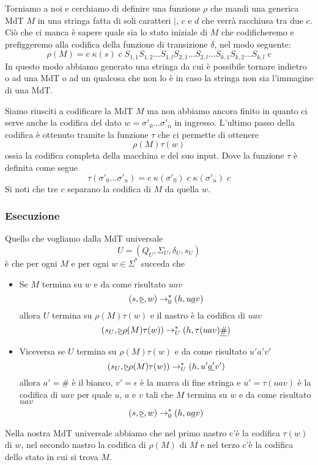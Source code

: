 Torniamo a noi e cerchiamo di definire una funzione $\rho$ che
mandi una generica MdT $M$ in una stringa fatta di soli caratteri
$\mid$, $c$ e $d$ che verrà racchiusa tra due $c$. Ciò che ci
manca è sapere quale sia lo stato iniziale di $M$ che
codificheremo e prefiggeremo alla codifica della funzione di
transizione $\delta$, nel modo seguente:
\[
	\rho (M) = c \; \kappa (s) \; c \;
	S_{1,1} S_{1,2} \dots
	S_{1,l} S_{2,1} \dots S_{2,l} \dots
	S_{k,1} S_{k,2} \dots S_{k,l} \; c
\]
In questo modo abbiamo generato una stringa da cui è possibile
tornare indietro o ad una MdT o ad un qualcosa che non lo è in
caso la stringa non sia l'immagine di una MdT.

Siamo riusciti a codificare la MdT $M$ ma non abbiamo ancora
finito in quanto ci serve anche la codifica del dato
$w = \sigma'_0 \dots \sigma'_n$ in ingresso. L'ultimo passo
della codifica è ottenuto tramite la funzione $\tau$ che ci
permette di ottenere
\[ \rho(M) \tau(w) \]
ossia la codifica completa della macchina e del suo input. Dove
la funzione $\tau$ è definita come segue
\[
	\tau(\sigma'_0 \dots \sigma'_n) =
	c \; \kappa(\sigma'_0) \;
	c \; \kappa(\sigma'_n) \; c
\]
Si noti che tre $c$ separano la codifica di $M$ da quella $w$.

\subsubsection{Esecuzione}
Quello che vogliamo dalla MdT universale
\[ U = (Q_U, \Sigma_U, \delta_U, s_U) \]
è che per ogni $M$ e per ogni $w \in \Sigma^*$ succeda che
\begin{itemize}
	\item Se $M$ termina su $w$ e da come risultato $uav$
	      \[
		      (s, \underline{\triangleright}, w) \rightarrow^*_0
		      (h, u \underline{a} v)
	      \]
	      allora $U$ termina su $\rho(M) \tau(w)$ e il nastro è
	      la codifica di $uav$
	      \[
		      (s_U, \underline{\triangleright} \rho(M) \tau(w))
		      \rightarrow^*_U (h, \tau(uav) \underline{\#})
	      \]
	\item Viceversa se $U$ termina su $\rho(M) \tau(w)$ e da come
	      risultato $u'a'v'$
	      \[
		      (s_U, \underline{\triangleright} \rho(M) \tau(w))
		      \rightarrow^*_U (h, u' \underline{a'}v')
	      \]
	      allora $a' = \#$ è il bianco, $v' = \epsilon$ è la
	      marca di fine stringa e $u' = \tau(uav)$ è la codifica
	      di $uav$ per quale $u$, $a$ e $v$ tali che $M$ termina
	      su $w$ e da come risultato $uav$
	      \[
		      (s, \underline{\triangleright}, w) \rightarrow^*_0
		      (h, u \underline{a} v)
	      \]
\end{itemize}
Nella nostra MdT universale abbiamo che nel primo nastro c'è la
codifica $\tau(w)$ di $w$, nel secondo nastro la codifica di
$\rho(M)$ di $M$ e nel terzo c'è la codifica dello stato in cui
si trova $M$.

